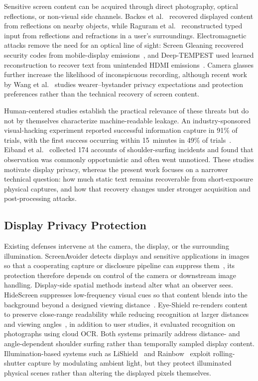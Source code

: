 \documentclass{ieeeaccess}
\begin{document}
Sensitive screen content can be acquired through direct photography, optical reflections, or non-visual side channels. Backes et al.~\cite{b_backes2009} recovered displayed content from reflections on nearby objects, while Raguram et al.~\cite{b_raguram2011} reconstructed typed input from reflections and refractions in a user's surroundings. Electromagnetic attacks remove the need for an optical line of sight: Screen Gleaning recovered security codes from mobile-display emissions~\cite{b_screengleaning2021}, and Deep-TEMPEST used learned reconstruction to recover text from unintended HDMI emissions~\cite{b_fernandez2024}. Camera glasses further increase the likelihood of inconspicuous recording, although recent work by Wang et al.~\cite{b_wang2026} studies wearer--bystander privacy expectations and protection preferences rather than the technical recovery of screen content.

Human-centered studies establish the practical relevance of these threats but do not by themselves characterize machine-readable leakage. An industry-sponsored visual-hacking experiment reported successful information capture in 91\% of trials, with the first success occurring within 15~minutes in 49\% of trials~\cite{b_ponemon2016}. Eiband et al.~\cite{b_eiband2017} collected 174 accounts of shoulder-surfing incidents and found that observation was commonly opportunistic and often went unnoticed. These studies motivate display privacy, whereas the present work focuses on a narrower technical question: how much static text remains recoverable from short-exposure physical captures, and how that recovery changes under stronger acquisition and post-processing attacks.

\subsection{Display Privacy Protection}

Existing defenses intervene at the camera, the display, or the surrounding illumination. ScreenAvoider detects displays and sensitive applications in images so that a cooperating capture or disclosure pipeline can suppress them~\cite{b_screenavoider2014}, its protection therefore depends on control of the camera or downstream image handling. Display-side spatial methods instead alter what an observer sees. HideScreen suppresses low-frequency visual cues so that content blends into the background beyond a designed viewing distance~\cite{b_hidescreen2019}. Eye-Shield re-renders content to preserve close-range readability while reducing recognition at larger distances and viewing angles~\cite{b_tang2023}, in addition to user studies, it evaluated recognition on photographs using cloud OCR. Both systems primarily address distance- and angle-dependent shoulder surfing rather than temporally sampled display content. Illumination-based systems such as LiShield~\cite{b_zhu2017} and Rainbow~\cite{b_rainbow2018} exploit rolling-shutter capture by modulating ambient light, but they protect illuminated physical scenes rather than altering the displayed pixels themselves.
\end{document}
